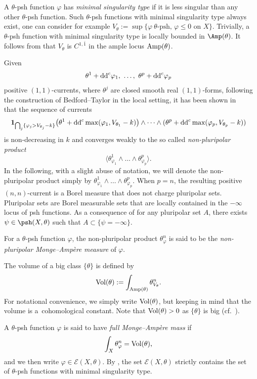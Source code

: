 A $\theta$-psh function $\varphi$ has \emph{minimal singularity type} if it is less singular than any other $\theta$-psh function. Such $\theta$-psh functions with minimal singularity type always exist, one can consider for example $V_\theta:=\sup \{ \varphi \ \theta\text{-psh},\, \varphi\le 0\text{ on } X \}$. Trivially, a $\theta$-psh function with minimal singularity type is locally bounded in $\Amp(\theta)$. It follows from \cite[Theorem~1.1]{DNT23} that $V_{\theta}$ is $C^{1, \bar{1}}$ in the ample locus ${\rm Amp}(\theta)$.

Given
\[\theta^1+{\rm dd}^c\varphi_1, \ \dots, \ \theta^p+{\rm dd}^c \varphi_p\] positive $(1,1)$-currents, where $\theta^j$ are closed smooth real $(1,1)$-forms, following the construction of Bedford--Taylor \cite{BT87} in the local setting, it has been shown in~\cite{BEGZ10} that the sequence of currents
\[
{\bf 1}_{\bigcap_j\{\varphi_j>V_{\theta_j}-k\}}\big(\theta^1+{\rm dd}^c \max(\varphi_1, V_{\theta_1}-k)\big)\wedge\dots\wedge (\theta^p+{\rm dd}^c\max(\varphi_p, V_{\theta_p}-k))
\]
is non-decreasing in $k$ and converges weakly to the so called \emph{non-pluripolar product}
\[%
\big\langle \theta^1_{\varphi_1 } \wedge\dots\wedge\theta^p_{\varphi_p}\big\rangle .
\]
In the following, with a slight abuse of notation, we will denote the non-pluripolar product simply by $\theta^1_{\varphi_1 } \wedge\dots\wedge\theta^p_{\varphi_p}$.
When $p =n$, the resulting positive $(n,n)$-current is a Borel measure that does not charge pluripolar sets. Pluripolar sets are Borel measurable sets that are locally contained in the $-\infty$ locus of psh functions. As a consequence of \cite[Corollary 2.11]{BBGZ13} for any pluripolar set $A$, there exists $\psi\in \psh(X,\theta)$ such that $A\subset \{\psi=-\infty\}$.

For a $\theta$-psh function $\varphi$, the non-pluripolar product $\theta_\varphi^n$ is said to be the \emph{non-pluripolar Monge--Amp{\`e}re measure} of $\varphi$.

The volume of a big class $\{ \theta\}$ is defined by
\[
{\rm Vol}(\theta):= \int_{{\rm Amp}(\theta)} \theta_{V_\theta}^n.
\]
For notational convenience, we simply write ${\rm Vol}(\theta)$, but keeping in mind that the volume is a~cohomological constant. Note that ${\rm Vol}(\theta)>0$ as $\{\theta\}$ is big (cf.\ \cite{BEGZ10}).

A $\theta$-psh function $\varphi$ is said to have \emph{full Monge--Amp\`ere mass} if
\[
\int_X \theta_\varphi^n={\rm Vol}(\theta),
\]
and we then write $\varphi\in \mathcal{E}(X,\theta)$. By \cite[Theorem 1.16]{BEGZ10}, the set $\mathcal{E}(X,\theta)$ strictly contains the set of $\theta$-psh functions with minimal singularity type.


